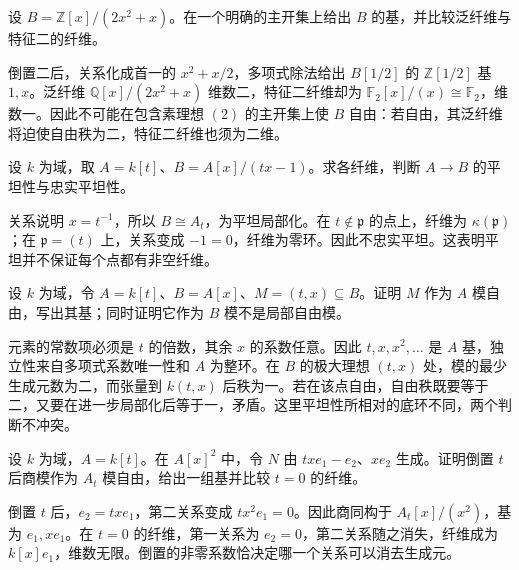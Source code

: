 \begin{exercise}\label{b3:ex:12-generic-free-integers}
	设 \(B=\mathbb Z[x]/(2x^2+x)\)。在一个明确的主开集上给出 \(B\) 的基，并比较泛纤维与特征二的纤维。
\end{exercise}
\begin{solution}
	倒置二后，关系化成首一的 \(x^2+x/2\)，多项式除法给出 \(B[1/2]\) 的 \(\mathbb Z[1/2]\) 基 \(1,x\)。泛纤维 \(\mathbb Q[x]/(2x^2+x)\) 维数二，特征二纤维却为 \(\mathbb F_2[x]/(x)\cong\mathbb F_2\)，维数一。因此不可能在包含素理想 \((2)\) 的主开集上使 \(B\) 自由：若自由，其泛纤维将迫使自由秩为二，特征二纤维也须为二维。
\end{solution}

\begin{exercise}\label{b3:ex:12-flat-empty-fiber}
	设 \(k\) 为域，取 \(A=k[t]\)、\(B=A[x]/(tx-1)\)。求各纤维，判断 \(A\to B\) 的平坦性与忠实平坦性。
\end{exercise}
\begin{solution}
	关系说明 \(x=t^{-1}\)，所以 \(B\cong A_t\)，为平坦局部化。在 \(t\notin\mathfrak p\) 的点上，纤维为 \(\kappa(\mathfrak p)\)；在 \(\mathfrak p=(t)\) 上，关系变成 \(-1=0\)，纤维为零环。因此不忠实平坦。这表明平坦并不保证每个点都有非空纤维。
\end{solution}

\begin{exercise}\label{b3:ex:12-infinite-generic-rank}
	设 \(k\) 为域，令 \(A=k[t]\)、\(B=A[x]\)、\(M=(t,x)\subseteq B\)。证明 \(M\) 作为 \(A\) 模自由，写出其基；同时证明它作为 \(B\) 模不是局部自由模。
\end{exercise}
\begin{solution}
	元素的常数项必须是 \(t\) 的倍数，其余 \(x\) 的系数任意。因此 \(t,x,x^2,\ldots\) 是 \(A\) 基，独立性来自多项式系数唯一性和 \(A\) 为整环。在 \(B\) 的极大理想 \((t,x)\) 处，模的最少生成元数为二，而张量到 \(k(t,x)\) 后秩为一。若在该点自由，自由秩既要等于二，又要在进一步局部化后等于一，矛盾。这里平坦性所相对的底环不同，两个判断不冲突。
\end{solution}

\begin{exercise}\label{b3:ex:12-standard-module-monomials}
	设 \(k\) 为域，\(A=k[t]\)。在 \(A[x]^2\) 中，令 \(N\) 由 \(txe_1-e_2\)、\(xe_2\) 生成。证明倒置 \(t\) 后商模作为 \(A_t\) 模自由，给出一组基并比较 \(t=0\) 的纤维。
\end{exercise}
\begin{solution}
	倒置 \(t\) 后，\(e_2=txe_1\)，第二关系变成 \(tx^2e_1=0\)。因此商同构于 \(A_t[x]/(x^2)\)，基为 \(e_1,xe_1\)。在 \(t=0\) 的纤维，第一关系为 \(e_2=0\)，第二关系随之消失，纤维成为 \(k[x]e_1\)，维数无限。倒置的非零系数恰决定哪一个关系可以消去生成元。
\end{solution}

